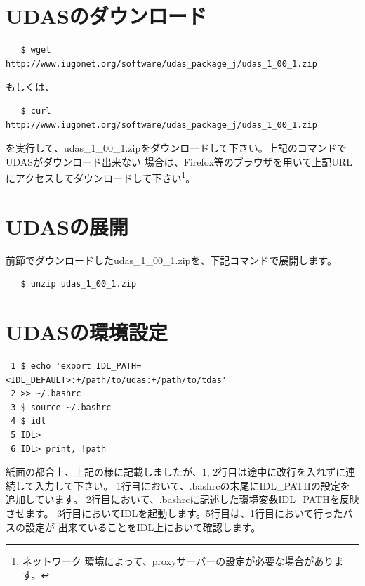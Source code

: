 \documentclass[a4j]{jbook}
\begin{document}
\section{UDASのダウンロード}
\begin{screen}
\begin{verbatim}
   $ wget http://www.iugonet.org/software/udas_package_j/udas_1_00_1.zip
\end{verbatim}
\end{screen}
もしくは、
\begin{screen}
\begin{verbatim}
   $ curl http://www.iugonet.org/software/udas_package_j/udas_1_00_1.zip
\end{verbatim}
\end{screen}
を実行して、udas\_1\_00\_1.zipをダウンロードして下さい。上記のコマンドでUDASがダウンロード出来ない
場合は、Firefox等のブラウザを用いて上記URLにアクセスしてダウンロードして下さい\footnote{ネットワーク
環境によって、proxyサーバーの設定が必要な場合があります。}。

\section{UDASの展開}
前節でダウンロードしたudas\_1\_00\_1.zipを、下記コマンドで展開します。
\begin{screen}
\begin{verbatim}
   $ unzip udas_1_00_1.zip
\end{verbatim}
\end{screen}

\section{UDASの環境設定}

\begin{screen}
\begin{verbatim}
 1 $ echo 'export IDL_PATH=<IDL_DEFAULT>:+/path/to/udas:+/path/to/tdas' 
 2 >> ~/.bashrc
 3 $ source ~/.bashrc
 4 $ idl
 5 IDL>
 6 IDL> print, !path
\end{verbatim}
\end{screen}
紙面の都合上、上記の様に記載しましたが、1, 2行目は途中に改行を入れずに連続して入力して下さい。
1行目において、.bashrcの末尾にIDL\_PATHの設定を追加しています。
2行目において、.bashrcに記述した環境変数IDL\_PATHを反映させます。
3行目においてIDLを起動します。5行目は、1行目において行ったパスの設定が
出来ていることをIDL上において確認します。
\end{document}
